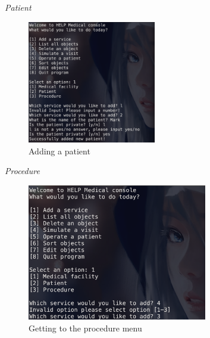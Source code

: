 \documentclass{article}
\begin{document}
	\newpage

	\textit{Patient}
	\begin{figure}
		\begin{center}
			\includegraphics[width=0.5\textwidth]{figures/Adding/Patient/Patient_01.png}
		\end{center}
		\caption{Adding a patient}\label{fig:patient_01}
	\end{figure}

	\textit{Procedure}
	\begin{figure}
		\begin{center}
			\includegraphics[width=0.7\textwidth]{figures/Adding/Procedure/Procedure_01.png}
		\end{center}
		\caption{Getting to the procedure menu}\label{fig:procedure_01}
	\end{figure}
	
\end{document}
